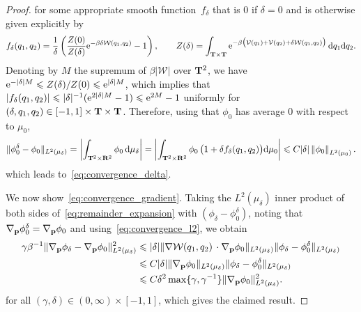 \documentclass[11pt,a4paper]{article}
\begin{document}
\begin{proof}
    \)
    for some appropriate smooth function~$f_{\delta}$ that is $0$ if $\delta = 0$ and is otherwise given explicitly by
    \[
        f_{\delta}(q_1, q_2) = \frac{1}{\delta} \left( \frac{Z(0)}{Z(\delta)} \mathrm{e}^{- \beta \delta \mathcal W(q_1, q_2)} - 1 \right),
        \qquad Z(\delta) = \int_{\mathbf T \times \mathbf T} \mathrm{e}^{- \beta\bigl(\mathcal V(q_1) + \mathcal V(q_2) + \delta \mathcal W(q_1, q_2)\bigr)} \, \mathrm d q_1 \mathrm d q_2.
    \]
    Denoting by $M$ the supremum of $\beta |\mathcal W|$ over $\mathbf T^2$,
    we have $\mathrm{e}^{-\lvert \delta \rvert M} \leqslant Z(\delta)/Z(0) \leqslant \mathrm{e}^{\lvert \delta \rvert M}$,
    which implies that $\lvert f_{\delta}(q_1, q_2) \rvert \leqslant \lvert \delta \rvert^{-1}(\mathrm{e}^{2 \lvert \delta \rvert M} - 1) \leqslant \mathrm{e}^{2M} -1$
    uniformly for $(\delta, q_1, q_2) \in [-1, 1] \times \mathbf T \times \mathbf T$.
    Therefore, using that $\phi_0$ has average 0 with respect to $\mu_0$,
    \[
        \norm*{\phi_0^\delta - \phi_0} [L^2(\mu_\delta)]
        = \abs{ \int_{\torus^2 \times \real^2} \phi_0 \, \d \mu_{\delta} }
        = \abs{ \int_{\torus^2 \times \real^2} \phi_0 \,\bigl( 1 + \delta f_{\delta}(q_1, q_2) \bigr)\d \mu_{0}}
        \leq C \lvert \delta \rvert \norm{\phi_0}[L^2(\mu_0)].
    \]
    which leads to~\eqref{eq:convergence_delta}.

    We now show~\eqref{eq:convergence_gradient}.
    Taking the $L^2(\mu_{\delta})$ inner product of both sides of~\eqref{eq:remainder_expansion} with $(\phi_\delta - \phi_0^{\delta})$,
    noting that $\nabla_{\boldsymbol{\mathbf p}} \phi_0^{\delta} = \nabla_{\boldsymbol{\mathbf p}} \phi_0$
    and using~\eqref{eq:convergence_l2},
    we obtain
    \begin{align*}
        \notag
        \gamma \beta^{-1} \norm*{\grad_{\vect p} \phi_\delta - \grad_{\vect p} \phi_0}[L^2(\mu_{\delta})]^2
        &\leq \lvert \delta \rvert \norm*{\grad \mathcal W(q_1, q_2) \, \cdot \grad_{\vect p} \phi_0}[L^2(\mu_{\delta})] \norm*{\phi_\delta - \phi_0^{\delta}}[L^2(\mu_{\delta})] \\
        \label{eq:intermediate_delta}
        &\leq C \lvert \delta \rvert \norm*{\grad_{\vect p} \phi_0}[L^2(\mu_{\delta})] \norm*{\phi_\delta - \phi_0^{\delta}}[L^2(\mu_{\delta})] \\
        &\leq  C \delta^2 \max\{\gamma, \gamma^{-1}\} \norm*{\grad_{\vect p} \phi_0}[L^2(\mu_{\delta})]^2.
    \end{align*}
    for all $(\gamma, \delta) \in (0, \infty) \times [-1, 1]$,
    which gives the claimed result.
\end{proof}
\end{document}
